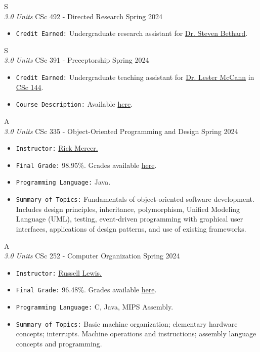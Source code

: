 \cventry
{S \\ \small{\textit{3.0 Units}}}
{CSc 492 - Directed Research}
{Spring 2024}
{}
{}
{
  \begin{itemize}
    \item \texttt{Credit Earned:} Undergraduate research assistant for \href{https://bethard.github.io/}{Dr. Steven Bethard}.
  \end{itemize}
}

\cventry
{S \\ \small{\textit{3.0 Units}}}
{CSc 391 - Preceptorship}
{Spring 2024}
{}
{}
{
  \begin{itemize}
    \item \texttt{Credit Earned:} Undergraduate teaching assistant for \href{https://mccann.cs.arizona.edu/}{Dr. Lester McCann} in \href{https://www2.cs.arizona.edu/classes/cs144/fall23-002/}{CSc 144}.
    \item \texttt{Course Description:} Available \href{https://mhrezaei.com/assets/cv/courses/Fall2023/CSC391/Syllabus.pdf}{here}.
  \end{itemize}
}

\cventry
{A \\ \small{\textit{3.0 Units}}}
{CSc 335 - Object-Oriented Programming and Design}
{Spring 2024}
{}
{}
{
  \begin{itemize}
    \item \texttt{Instructor:} \href{https://www2.cs.arizona.edu/~mercer/}{Rick Mercer.}
    \item \texttt{Final Grade:} 98.95\%. Grades available \href{https://mhrezaei.com/assets/cv/courses/Spring2024/CSC335/Grades.pdf}{here}.
    \item \texttt{Programming Language:} Java.
    \item \texttt{Summary of Topics:} Fundamentals of object-oriented software development. Includes design principles, inheritance, polymorphism, Unified Modeling Language (UML), testing, event-driven programming with graphical user interfaces, applications of design patterns, and use of existing frameworks.
  \end{itemize}
}


\cventry
{A \\ \small{\textit{3.0 Units}}}
{CSc 252 - Computer Organization}
{Spring 2024}
{}
{}
{
  \begin{itemize}
    \item \texttt{Instructor:} \href{https://www.cs.arizona.edu/person/russell-lewis}{Russell Lewis.}
    \item \texttt{Final Grade:} 96.48\%. Grades available \href{https://mhrezaei.com/assets/cv/courses/Spring2024/CSC252/Grades.pdf}{here}.
    \item \texttt{Programming Language:} C, Java, MIPS Assembly.
    \item \texttt{Summary of Topics:} Basic machine organization; elementary hardware concepts; interrupts. Machine operations and instructions; assembly language concepts and programming.
  \end{itemize}
}

